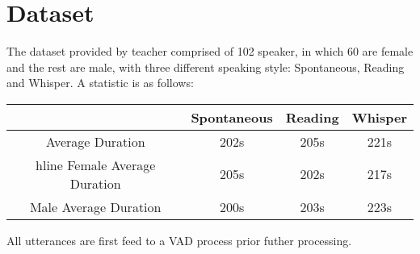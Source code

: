 \section{Dataset}
	The dataset provided by teacher comprised of 102 speaker, in which 60 are
	female and the rest are male, with three different speaking style: Spontaneous,
	Reading and Whisper. A statistic is as follows:
	\begin{table}
		\centering
		\begin{tabular}{|c|c|c|c|}
			& Spontaneous & Reading & Whisper \\\hline
			Average Duration & 202s & 205s & 221s \\hline
			Female Average Duration & 205s & 202s & 217s \\\hline
			Male Average Duration & 200s & 203s & 223s \\\hline
		\end{tabular}
	\end{table}
	All utterances are first feed to a VAD process prior futher processing.

